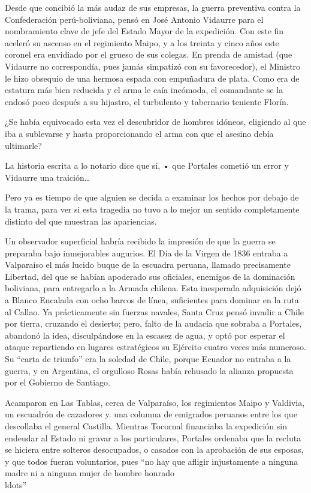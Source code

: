 \documentclass[10pt,twoside,openright]{memoir}
\begin{document}
Desde que concibió la más audaz de sus empresas, la guerra preventiva
contra la Confederación perú-boliviana, pensó en José Antonio Vidaurre
para el nombramiento clave de jefe del Estado Mayor de la expedición.
Con este fin aceleró su ascenso en el regimiento Maipo, y a los treinta
y cinco años este coronel era envidiado por el grueso de sus colegas. En
prenda de amistad (que Vidaurre no correspondía, pues jamás simpatizó
con su favorecedor), el Ministro le hizo obsequio de una hermosa espada
con empuñadura de plata. Como era de estatura más bien reducida y el
arma le caía incómoda, el comandante se la endosó poco después a su
hijastro, el turbulento y tabernario teniente Florín.

¿Se había equivocado esta vez el descubridor de hombres idóneos,
eligiendo al que iba a sublevarse y hasta proporcionando el arma con que
el asesino debía ultimarle?

La historia escrita a lo notario dice que sí, • que Portales cometió un
error y Vidaurre una traición\ldots

Pero ya es tiempo de que alguien se decida a examinar los hechos por
debajo de la trama, para ver si esta tragedia no tuvo a lo mejor un
sentido completamente distinto del que muestran las apariencias.

Un observador superficial habría recibido la impresión de que la guerra
se preparaba bajo inmejorables augurios. El Día de la Virgen de 1836
entraba a Valparaíso el más lucido buque de la escuadra peruana, llamado
precisamente Libertad, del que se habían apoderado sus oficiales,
enemigos de la dominación boliviana, para entregarlo a la Armada
chilena. Esta inesperada adquisición dejó a Blanco Encalada con ocho
barcos de línea, suficientes para dominar en la ruta al Callao. Ya
prácticamente sin fuerzas navales, Santa Cruz pensó invadir a Chile por
tierra, cruzando el desierto; pero, falto de la audacia que sobraba a
Portales, abandonó la idea, disculpándose en la escasez de agua, y optó
por esperar el ataque repartiendo en lugares estratégicos su Ejército
cuatro veces más numeroso. Su ``carta de triunfo'' era la soledad de
Chile, porque Ecuador no entraba a la guerra, y en Argentina, el
orgulloso Rosas había rehusado la alianza propuesta por el Gobierno de
Santiago.

Acamparon en Las Tablas, cerca de Valparaíso, los regimientos Maipo y
Valdivia, un escuadrón de cazadores y. una columna de emigrados peruanos
entre los que descollaba el general Castilla. Mientras Tocornal
financiaba la expedición sin endeudar al Estado ni gravar a los
particulares, Portales ordenaba que la recluta se hiciera entre solteros
desocupados, o casados con la aprobación de sus esposas, y que todos
fueran voluntarios, pues ``no hay que afligir injustamente a ninguna
madre ni a ninguna mujer de hombre honrado\\ldots''
\end{document}
